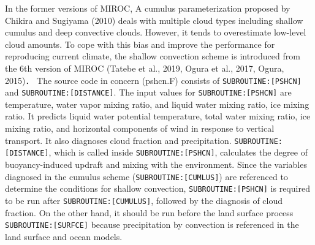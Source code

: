 In the former versions of MIROC, A cumulus parameterization proposed by Chikira and Sugiyama (2010) deals with multiple cloud types including shallow cumulus and deep convective clouds. However, it tends to overestimate low-level cloud amounts.
To cope with this bias and improve the performance for reproducing current climate, the shallow convection scheme is introduced from the 6th version of MIROC (Tatebe et al., 2019, Ogura et al., 2017, Ogura, 2015)．
The source code in concern (pshcn.F) consists of \texttt{SUBROUTINE:[PSHCN]} and \texttt{SUBROUTINE:[DISTANCE]}. The input values for \texttt{SUBROUTINE:[PSHCN]} are temperature, water vapor mixing ratio, and liquid water mixing ratio, ice mixing ratio.
It predicts liquid water potential temperature, total water mixing ratio, ice mixing ratio, and horizontal components of wind in response to vertical transport. It also diagnoses cloud fraction and precipitation.
\texttt{SUBROUTINE:[DISTANCE]}, which is called inside \texttt{SUBROUTINE:[PSHCN]}, calculates the degree of buoyancy-induced updraft and mixing with the environment.
Since the variables diagnosed in the cumulus scheme (\texttt{SUBROUTINE:[CUMLUS]}) are referenced to determine the conditions for shallow convection, \texttt{SUBROUTINE:[PSHCN]} is required to be run after \texttt{SUBROUTINE:[CUMULUS]}, followed by the diagnosis of cloud fraction.
On the other hand, it should be run before the land surface process \texttt{SUBROUTINE:[SURFCE]} because precipitation by convection is referenced in the land surface and ocean models.


